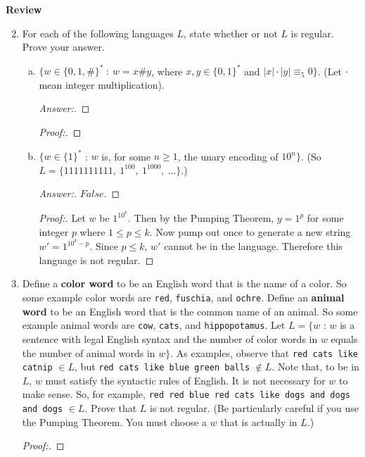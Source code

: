 \documentclass[10pt]{article}
\newcommand{\card}[1]{\left| #1 \right|}
\begin{document}
\noindent
\textbf{Review}
\begin{enumerate}[1)]
\setcounter{enumi}{1}

\item
For each of the following languages $L$, state whether or not $L$ is regular. Prove your answer.
\begin{enumerate}[a)]
\item
$\{w \in \{0, 1, \#\}^*\ :\ w = x\#y$, where $x, y \in \{0, 1\}^*$ and $\card{x}\cdot \card{y} \equiv _5 0\}$.  (Let $\cdot$ mean integer multiplication).
\begin{proof}[Answer:]
\end{proof}
\begin{proof}[Proof:]
\end{proof}

\item
$\{w \in \{1\}^*$ : $w$ is, for some $n \geq 1$, the unary encoding of $10^n\}$.  (So $L = \{1111111111,\ 1^{100},\ 1^{1000},\ \ldots\}$.)
\begin{proof}[Answer:]
$False$.
\end{proof}
\begin{proof}[Proof:]
Let $w$ be $1^{10^k}$.  Then by the Pumping Theorem, $y = 1^p$ for some integer $p$ where $1 \leq p \leq k$.  Now pump out once to generate a new string $w' = 1^{10^k - p}$.  Since $p \leq k$, $w'$ cannot be in the language.  Therefore this language is not regular.
\end{proof}
\end{enumerate}



\item
Define a \textbf{color word} to be an English word that is the name of a color.  So some example color words are \texttt{red}, \texttt{fuschia}, and \texttt{ochre}.  Define an \textbf{animal word} to be an English word that is the common name of an animal.  So some example animal words are \texttt{cow}, \texttt{cats}, and \texttt{hippopotamus}.  Let $L = \{w$ : $w$ is a sentence with legal English syntax and the number of color words in $w$ equals the number of animal words in $w\}$.  As examples, observe that \texttt{red cats like catnip} $\in L$, but \texttt{red cats like blue green balls} $\not \in L$.  Note that, to be in $L$, $w$ must satisfy the syntactic rules of English.  It is not necessary for $w$ to make sense.  So, for example, \texttt{red red blue red cats like dogs and dogs and dogs} $\in L$.  Prove that $L$ is not regular.  (Be particularly careful if you use the Pumping Theorem.  You must choose a $w$ that is actually in $L$.)
\begin{proof}[Proof:]
\end{proof}



\end{enumerate}
\end{document}
